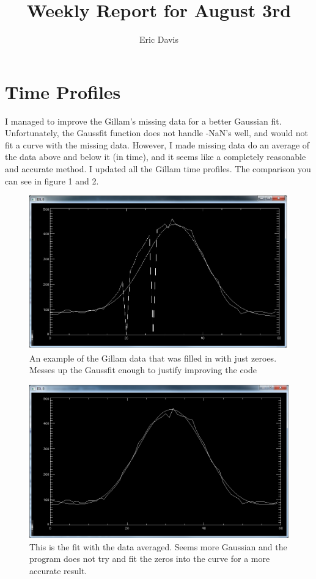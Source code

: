 \documentclass[11pt]{article}
\title{Weekly Report for August 3rd}
\author{Eric Davis}
\begin{document}
\maketitle
\medskip



\section{Time Profiles}
\hspace{0.5cm}

I managed to improve the Gillam's missing data for a better Gaussian fit. Unfortunately, the Gaussfit function does not handle -NaN's well, and would not fit a curve with the missing data. However, I made missing data do an average of the data above and below it (in time), and it seems like a completely reasonable and accurate method. I updated all the Gillam time profiles. The comparison you can see in figure 1 and 2.

\begin{figure}[h!]
\includegraphics[scale=0.6]{gillam_jupiter_filled_data_11_20_2011.jpg}
\caption{An example of the Gillam data that was filled in with just zeroes. Messes up the Gaussfit enough to justify improving the code}
\end{figure}


\begin{figure}[h!]
\includegraphics[scale=0.6]{gillam_average_fill.jpg}
\caption{This is the fit with the data averaged. Seems more Gaussian and the program does not try and fit the zeros into the curve for a more accurate result.}
\end{figure}
\end{document}
